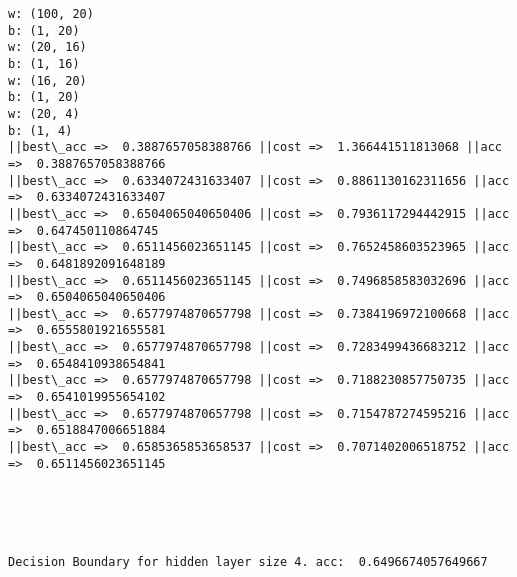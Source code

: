\documentclass[11pt]{article}
\begin{document}
    \begin{Verbatim}[commandchars=\\\{\}]
w: (100, 20)
b: (1, 20)
w: (20, 16)
b: (1, 16)
w: (16, 20)
b: (1, 20)
w: (20, 4)
b: (1, 4)
||best\_acc =>  0.3887657058388766 ||cost =>  1.366441511813068 ||acc =>  0.3887657058388766
||best\_acc =>  0.6334072431633407 ||cost =>  0.8861130162311656 ||acc =>  0.6334072431633407
||best\_acc =>  0.6504065040650406 ||cost =>  0.7936117294442915 ||acc =>  0.647450110864745
||best\_acc =>  0.6511456023651145 ||cost =>  0.7652458603523965 ||acc =>  0.6481892091648189
||best\_acc =>  0.6511456023651145 ||cost =>  0.7496858583032696 ||acc =>  0.6504065040650406
||best\_acc =>  0.6577974870657798 ||cost =>  0.7384196972100668 ||acc =>  0.6555801921655581
||best\_acc =>  0.6577974870657798 ||cost =>  0.7283499436683212 ||acc =>  0.6548410938654841
||best\_acc =>  0.6577974870657798 ||cost =>  0.7188230857750735 ||acc =>  0.6541019955654102
||best\_acc =>  0.6577974870657798 ||cost =>  0.7154787274595216 ||acc =>  0.6518847006651884
||best\_acc =>  0.6585365853658537 ||cost =>  0.7071402006518752 ||acc =>  0.6511456023651145

    \end{Verbatim}

    \begin{center}
    \end{center}
    { \hspace*{\fill} \\}
    
    \begin{center}
    \end{center}
    { \hspace*{\fill} \\}
    
    \begin{Verbatim}[commandchars=\\\{\}]
Decision Boundary for hidden layer size 4. acc:  0.6496674057649667

    \end{Verbatim}
\end{document}
